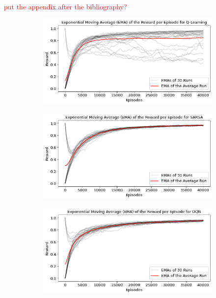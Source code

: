 \documentclass[conference]{IEEEtran}
\begin{document}
\textcolor{red}{put the appendix after the bibliography?}


\begin{figure}[htbp!]
    \centering
    \begin{subfigure}[]{.45\textwidth}
        \includegraphics[width=\textwidth]{../figures/rewards_30_runs_qlearning.png}
        \caption{}
    \end{subfigure}
    \begin{subfigure}[]{.45\textwidth}
        \includegraphics[width=\textwidth]{../figures/rewards_30_runs_sarsa.png}
        \caption{}
    \end{subfigure}
    \begin{subfigure}[]{.45\textwidth}
        \includegraphics[width=\textwidth]{../figures/rewards_30_runs_dqn.png}
        \caption{}
    \end{subfigure}
    \caption{}
    \label{fig:30runs_reward}
\end{figure}
    
\end{document}
